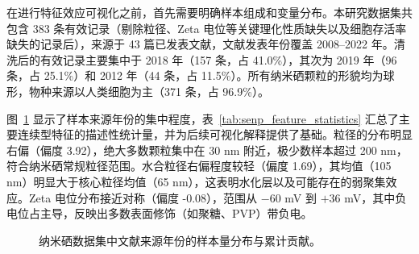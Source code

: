 在进行特征效应可视化之前，首先需要明确样本组成和变量分布。本研究数据集共包含 383 条有效记录（剔除粒径、Zeta 电位等关键理化性质缺失以及细胞存活率缺失的记录后），来源于 43 篇已发表文献，文献发表年份覆盖 2008--2022 年。清洗后的有效记录主要集中于 2018 年（157 条，占 41.0\%），其次为 2019 年（96 条，占 25.1\%）和 2012 年（44 条，占 11.5\%）。所有纳米硒颗粒的形貌均为球形，物种来源以人类细胞为主（371 条，占 96.9\%）。

图~\ref{fig:senp-year-distribution} 显示了样本来源年份的集中程度，表~\ref{tab:senp_feature_statistics} 汇总了主要连续型特征的描述性统计量，并为后续可视化解释提供了基础。粒径的分布明显右偏（偏度 3.92），绝大多数颗粒集中在 30 nm 附近，极少数样本超过 200 nm，符合纳米硒常规粒径范围。水合粒径右偏程度较轻（偏度 1.69），其均值（105 nm）明显大于核心粒径均值（65 nm），这表明水化层以及可能存在的弱聚集效应。Zeta 电位分布接近对称（偏度 -0.08），范围从 $-60$ mV 到 $+36$ mV，其中负电位占主导，反映出多数表面修饰（如聚糖、PVP）带负电。

\begin{figure}[H]
  \centering
  \begin{minipage}{0.48\linewidth}
    \centering
  \end{minipage}
  \hfill
  \begin{minipage}{0.48\linewidth}
    \centering
  \end{minipage}
  \caption{纳米硒数据集中文献来源年份的样本量分布与累计贡献。}
  \label{fig:senp-year-distribution}
\end{figure}

